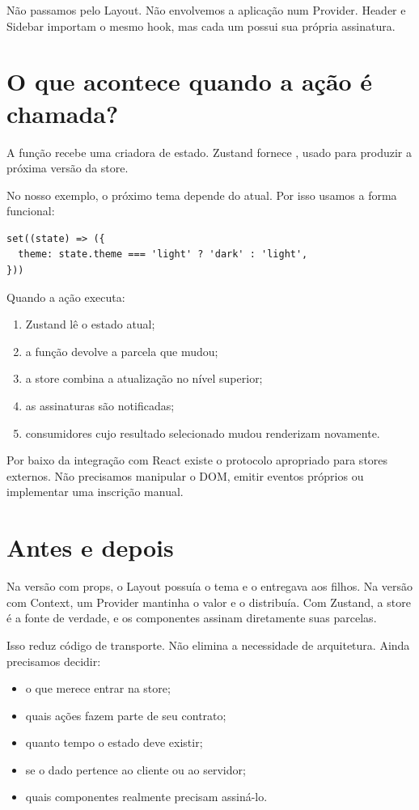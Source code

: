Não passamos  pelo Layout. Não envolvemos a aplicação num Provider.
Header e Sidebar importam o mesmo hook, mas cada um possui sua própria assinatura.

\section{O que acontece quando a ação é chamada?}

A função  recebe uma criadora de estado. Zustand fornece
, usado para produzir a próxima versão da store.

No nosso exemplo, o próximo tema depende do atual. Por isso usamos a forma
funcional:

\begin{lstlisting}
set((state) => ({
  theme: state.theme === 'light' ? 'dark' : 'light',
}))
\end{lstlisting}

Quando a ação executa:

\begin{enumerate}
  \item Zustand lê o estado atual;
  \item a função devolve a parcela que mudou;
  \item a store combina a atualização no nível superior;
  \item as assinaturas são notificadas;
  \item consumidores cujo resultado selecionado mudou renderizam novamente.
\end{enumerate}

Por baixo da integração com React existe o protocolo apropriado para stores
externos. Não precisamos manipular o DOM, emitir eventos próprios ou implementar
uma inscrição manual.

\section{Antes e depois}

Na versão com props, o Layout possuía o tema e o entregava aos filhos. Na versão
com Context, um Provider mantinha o valor e o distribuía. Com Zustand, a store é
a fonte de verdade, e os componentes assinam diretamente suas parcelas.

Isso reduz código de transporte. Não elimina a necessidade de arquitetura.
Ainda precisamos decidir:

\begin{itemize}
  \item o que merece entrar na store;
  \item quais ações fazem parte de seu contrato;
  \item quanto tempo o estado deve existir;
  \item se o dado pertence ao cliente ou ao servidor;
  \item quais componentes realmente precisam assiná-lo.
\end{itemize}

